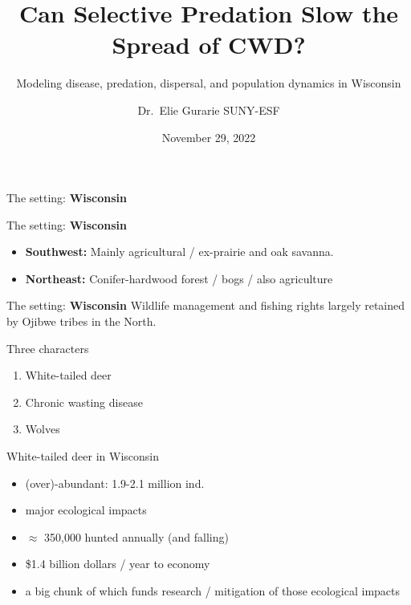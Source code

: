 \documentclass[
  11pt,
  ignorenonframetext,
  aspectratio=43]{beamer}
\title{Can Selective Predation Slow the Spread of CWD?}
\subtitle{Modeling disease, predation, dispersal, and population
dynamics in Wisconsin}
\author{Dr.~Elie Gurarie \textbar{} SUNY-ESF}
\date{November 29, 2022}
\providecommand{\tightlist}{%
  \setlength{\itemsep}{0pt}\setlength{\parskip}{0pt}}
\begin{document}
\frame{\titlepage}

\begin{frame}{The setting: \textbf{Wisconsin}}
\protect\hypertarget{the-setting-wisconsin}{}
\end{frame}

\begin{frame}{The setting: \textbf{Wisconsin}}
\protect\hypertarget{the-setting-wisconsin-1}{}
\bc {}
 \ec

\begin{itemize}
\tightlist
\item
  \textbf{Southwest:} Mainly agricultural / ex-prairie and oak savanna.
\item
  \textbf{Northeast:} Conifer-hardwood forest / bogs / also agriculture
\end{itemize}
\end{frame}

\begin{frame}{The setting: \textbf{Wisconsin}}
\protect\hypertarget{the-setting-wisconsin-2}{}
\bc  {} \ec Wildlife management and
fishing rights largely retained by Ojibwe tribes in the North.
\end{frame}

\begin{frame}{Three characters}
\protect\hypertarget{three-characters}{}
\Large

\begin{enumerate}
\tightlist
\item
  White-tailed deer
\item
  Chronic wasting disease
\item
  Wolves
\end{enumerate}
\end{frame}

\begin{frame}{White-tailed deer in Wisconsin}
\protect\hypertarget{white-tailed-deer-in-wisconsin}{}
\bcol

\col[.6]


\small

\begin{itemize}
\tightlist
\item
  (over)-abundant: 1.9-2.1 million ind.
\item
  major ecological impacts
\item
  \(\approx\) 350,000 hunted annually (and falling)
\item
  \$1.4 billion dollars / year to economy
\item
  a big chunk of which funds research / mitigation of those ecological
  impacts
\end{itemize}

\ebb

\col[.4]
\bc\scriptsize {}\ec
\ecol
\end{frame}
\end{document}
